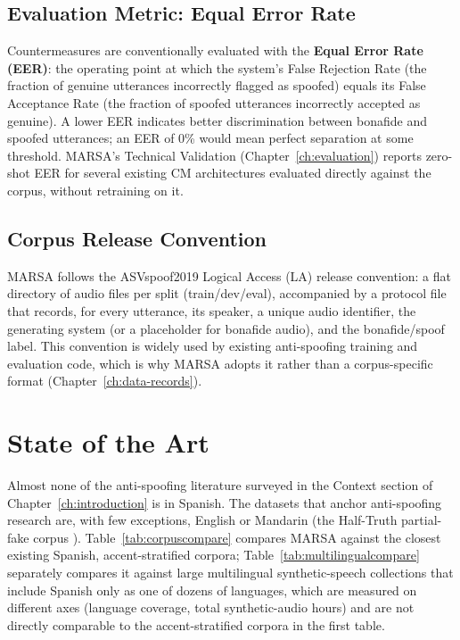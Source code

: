 \documentclass[11pt]{report}
\begin{document}
\subsection{Evaluation Metric: Equal Error Rate}

Countermeasures are conventionally evaluated with the \textbf{Equal Error
Rate (EER)}: the operating point at which the system's False Rejection
Rate (the fraction of genuine utterances incorrectly flagged as spoofed)
equals its False Acceptance Rate (the fraction of spoofed utterances
incorrectly accepted as genuine). A lower EER indicates better
discrimination between bonafide and spoofed utterances; an EER of 0\%
would mean perfect separation at some threshold. MARSA's Technical
Validation (Chapter~\ref{ch:evaluation}) reports zero-shot EER for
several existing CM architectures evaluated directly against the corpus,
without retraining on it.

\subsection{Corpus Release Convention}

MARSA follows the ASVspoof2019 Logical Access (LA) release convention: a
flat directory of audio files per split (train/dev/eval), accompanied by
a protocol file that records, for every utterance, its speaker, a unique
audio identifier, the generating system (or a placeholder for bonafide
audio), and the bonafide/spoof label. This convention is widely used by
existing anti-spoofing training and evaluation code, which is why MARSA
adopts it rather than a corpus-specific format
(Chapter~\ref{ch:data-records}).

\section{State of the Art}
\label{sec:sota}

Almost none of the anti-spoofing literature surveyed in the Context
section of Chapter~\ref{ch:introduction} is in Spanish. The datasets that
anchor anti-spoofing research are, with few exceptions, English or
Mandarin (the Half-Truth partial-fake corpus \citep{yi2021had}).
Table~\ref{tab:corpuscompare}
compares MARSA against the closest existing Spanish, accent-stratified
corpora; Table~\ref{tab:multilingualcompare} separately compares it
against large multilingual synthetic-speech collections that include
Spanish only as one of dozens of languages, which are measured on
different axes (language coverage, total synthetic-audio hours) and are
not directly comparable to the accent-stratified corpora in the first
table.
\end{document}
